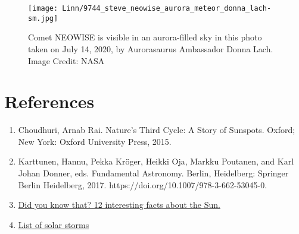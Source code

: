 \documentclass{../template/texnote}
\begin{document}
\begin{figure}
    \centering
    \texttt{[image: Linn/9744\_steve\_neowise\_aurora\_meteor\_donna\_lach-sm.jpg]}
    \caption{Comet NEOWISE is visible in an aurora-filled sky in this photo taken on July 14, 2020, by Aurorasaurus Ambassador Donna Lach. Image Credit: NASA}
    \label{fig:aurora}
\end{figure}


\section{References}
\begin{enumerate}

 \item Choudhuri, Arnab Rai. Nature's Third Cycle: A Story of Sunspots. Oxford; New York: Oxford University Press, 2015.
 \item Karttunen, Hannu, Pekka Kröger, Heikki Oja, Markku Poutanen, and Karl Johan Donner, eds. Fundamental Astronomy. Berlin, Heidelberg: Springer Berlin Heidelberg, 2017. https://doi.org/10.1007/978-3-662-53045-0.
    \item \href{https://universemagazine.com/en/did-you-know-that-12-interesting-facts-about-the-sun/}{Did you know that? 12 interesting facts about the Sun.}
    \item \href{https://en.wikipedia.org/wiki/List_of_solar_storms}{List of solar storms}
\end{enumerate}
    \printbibliography
\end{document}
